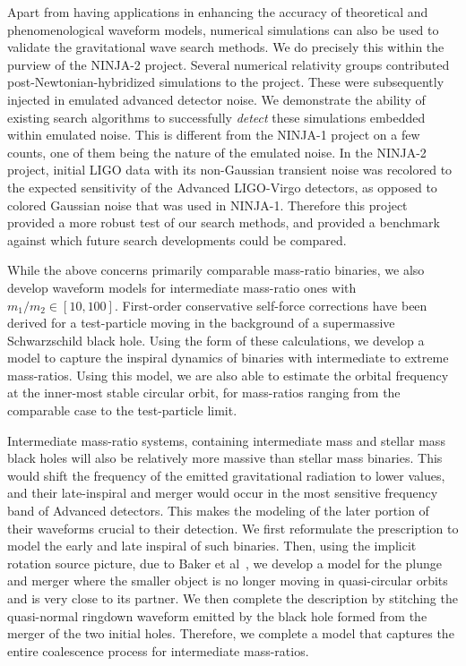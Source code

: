 Apart from having applications in enhancing the accuracy of theoretical 
and phenomenological waveform models, numerical simulations can also be used
to validate the gravitational wave search methods. We do precisely this within
the purview of the NINJA-2 project. Several numerical relativity groups contributed
post-Newtonian-hybridized simulations to the project. These were subsequently
injected in emulated advanced detector noise. We demonstrate the ability of
existing search algorithms to successfully {\it detect} these simulations
embedded within emulated noise. This is different from the NINJA-1 project
on a few counts, one of them being the nature of the emulated noise. In the 
NINJA-2 project, initial LIGO data with its non-Gaussian transient noise was
recolored to the expected sensitivity of the Advanced LIGO-Virgo detectors, as
opposed to colored Gaussian noise that was used in NINJA-1. 
Therefore this project provided a more robust test of our search methods, and 
provided a benchmark against which future search developments could be compared.


While the above concerns primarily comparable mass-ratio binaries, we 
also develop waveform models for intermediate mass-ratio ones with 
$m_1/m_2 \in [10, 100]$. First-order conservative self-force corrections 
have been derived for a test-particle moving in the background of a 
supermassive Schwarzschild black hole. Using the form of these calculations,
we develop a model to capture the inspiral dynamics of binaries with 
intermediate to extreme mass-ratios. Using this model, we are also able to 
estimate the orbital frequency at the inner-most stable circular orbit, 
for mass-ratios ranging from the comparable case to the test-particle limit.

Intermediate mass-ratio systems, containing intermediate mass and stellar
mass black holes will also be relatively more massive than stellar mass binaries.
This would shift the frequency of the emitted gravitational radiation to 
lower values, and their late-inspiral and merger would occur in the most
sensitive frequency band of Advanced detectors. This makes the modeling 
of the later portion of their waveforms crucial to their detection. 
We first reformulate the prescription to model the early and late inspiral
of such binaries. Then, using the implicit rotation source picture,
due to Baker et al~\cite{Baker:2008}, we develop a model for the plunge and merger
where the smaller object is no longer moving in quasi-circular orbits
and is very close to its partner. We then complete the description 
by stitching the quasi-normal ringdown waveform emitted by the black hole formed from 
the merger of the two initial holes. Therefore, we complete a model that
captures the entire coalescence process for intermediate mass-ratios.

